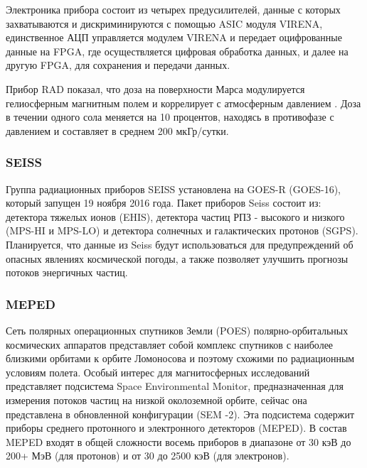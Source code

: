 Электроника прибора состоит из четырех предусилителей, данные с которых захватываются и дискриминируются с помощью ASIC модуля VIRENA, единственное АЦП управляется модулем VIRENA и передает оцифрованные данные на FPGA, где осуществляется цифровая обработка данных, и далее на другую FPGA, для сохранения и передачи данных. 

Прибор RAD показал, что доза на поверхности Марса модулируется гелиосферным магнитным полем и коррелирует с атмосферным давлением \cite{Guo2017}. Доза в течении одного сола меняется на 10 процентов, находясь в противофазе с давлением и составляет в среднем 200 мкГр/сутки.


%
%
%
%

\subsubsection{SEISS}
Группа радиационных приборов SEISS установлена на GOES-R (GOES-16)\cite{Goodman2013}, который запущен 19 ноября 2016 года. 
Пакет приборов Seiss состоит из: детектора тяжелых ионов  (EHIS), детектора частиц РПЗ - высокого и низкого (MPS-HI и MPS-LO) и детектора солнечных и галактических протонов (SGPS). Планируется, что данные из Seiss будут использоваться для предупреждений об опасных явлениях космической погоды, а также позволяет улучшить прогнозы потоков энергичных частиц. 

\subsubsection{MEPED}
Сеть полярных операционных спутников Земли (POES) полярно-орбитальных космических аппаратов представляет собой комплекс спутников с наиболее близкими орбитами к орбите Ломоносова и поэтому схожими по радиационным условиям полета. Особый интерес для магнитосферных исследований представляет подсистема Space Environmental Monitor, предназначенная для измерения потоков частиц на низкой околоземной орбите, сейчас она представлена ​​в обновленной конфигурации (SEM -2). Эта подсистема содержит приборы среднего протонного и электронного детекторов (MEPED).
В состав MEPED входят в общей сложности восемь приборов в диапазоне от 30 кэВ до 200+ МэВ (для протонов) и от 30 до 2500 кэВ (для электронов).

